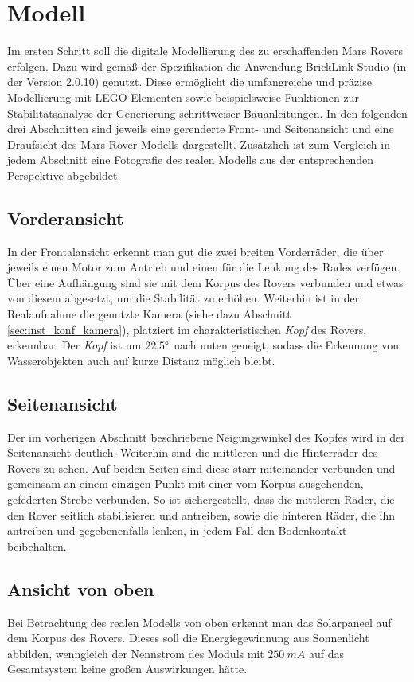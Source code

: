 \chapter{Modell}
\label{chp:Modell}

Im ersten Schritt soll die digitale Modellierung des zu erschaffenden Mars Rovers erfolgen.
Dazu wird gemäß der Spezifikation die Anwendung BrickLink-Studio (in der Version 2.0.10) genutzt.
Diese ermöglicht die umfangreiche und präzise Modellierung mit LEGO-Elementen sowie beispielsweise Funktionen zur Stabilitätsanalyse der Generierung schrittweiser Bauanleitungen.
In den folgenden drei Abschnitten sind jeweils eine gerenderte Front- und Seitenansicht und eine Draufsicht des Mars-Rover-Modells dargestellt.
Zusätzlich ist zum Vergleich in jedem Abschnitt eine Fotografie des realen Modells aus der entsprechenden Perspektive abgebildet.

\section{Vorderansicht}
\label{sec:voderansicht}


In der Frontalansicht erkennt man gut die zwei breiten Vorderräder, die über jeweils einen Motor zum Antrieb und einen für die Lenkung des Rades verfügen.
Über eine Aufhängung sind sie mit dem Korpus des Rovers verbunden und etwas von diesem abgesetzt, um die Stabilität zu erhöhen.
Weiterhin ist in der Realaufnahme die genutzte Kamera (siehe dazu Abschnitt \ref{sec:inst_konf_kamera}), platziert im charakteristischen \textit{Kopf} des Rovers, erkennbar.
Der \textit{Kopf} ist um $22{,}5 \degree$ nach unten geneigt, sodass die Erkennung von Wasserobjekten auch auf kurze Distanz möglich bleibt.

\section{Seitenansicht}
\label{sec:seitenansicht}

Der im vorherigen Abschnitt beschriebene Neigungswinkel des Kopfes wird in der Seitenansicht deutlich.
Weiterhin sind die mittleren und die Hinterräder des Rovers zu sehen.
Auf beiden Seiten sind diese starr miteinander verbunden und gemeinsam an einem einzigen Punkt mit einer vom Korpus ausgehenden, gefederten Strebe verbunden.
So ist sichergestellt, dass die mittleren Räder, die den Rover seitlich stabilisieren und antreiben, sowie die hinteren Räder, die ihn antreiben und gegebenenfalls lenken, in jedem Fall den Bodenkontakt beibehalten.

\section{Ansicht von oben}
\label{sec:draufsicht}

Bei Betrachtung des realen Modells von oben erkennt man das Solarpaneel auf dem Korpus des Rovers.
Dieses soll die Energiegewinnung aus Sonnenlicht abbilden, wenngleich der Nennstrom des Moduls mit $250\ mA$ auf das Gesamtsystem keine großen Auswirkungen hätte.